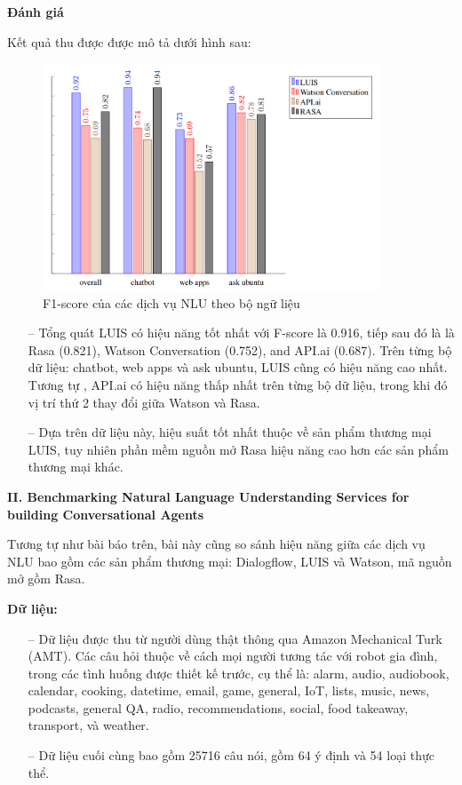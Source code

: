 \textbf{Đánh giá}

Kết quả thu được được mô tả dưới hình sau:

\begin{figure}[htp]
    \centering
    \includegraphics[width=10cm]{images/comparisonimg/FscoresNLUServices.png}
    \caption{F1-score của các dịch vụ NLU theo bộ ngữ liệu}
    \label{fig:comparisonimg-FscoresNLUServices}
\end{figure}

\begin{itemize}
    \item[--] Tổng quát LUIS có hiệu năng tốt nhất với F-score là 0.916, tiếp sau đó là là Rasa (0.821), Watson Conversation (0.752), and API.ai (0.687). Trên từng bộ dữ liệu: chatbot, web apps và ask ubuntu, LUIS cũng có hiệu năng cao nhất. Tương tự , API.ai có hiệu năng thấp nhất trên từng bộ dữ liệu, trong khi đó vị trí thứ 2 thay đổi giữa Watson và Rasa.
    \item[--] Dựa trên dữ liệu này, hiệu suất tốt nhất thuộc về sản phẩm thương mại LUIS, tuy nhiên phần mềm nguồn mở Rasa hiệu năng cao hơn các sản phẩm thương mại khác.
\end{itemize}

\textbf{II. Benchmarking Natural Language Understanding Services for building Conversational Agents}

Tương tự như bài báo trên, bài này cũng so sánh hiệu năng giữa các dịch vụ NLU bao gồm các sản phẩm thương mại: Dialogflow, LUIS và Watson, mã nguồn mở gồm Rasa.

\textbf{Dữ liệu: }

\begin{itemize}
    \item[--] Dữ liệu được thu từ người dùng thật thông qua Amazon Mechanical Turk (AMT). Các câu hỏi thuộc về cách mọi người tương tác với robot gia đình, trong các tình huống được thiết kế trước, cụ thể là: alarm, audio, audiobook, calendar, cooking, datetime, email, game, general, IoT, lists, music, news, podcasts, general QA, radio, recommendations, social, food takeaway, transport, và weather.
    \item[--] Dữ liệu cuối cùng bao gồm 25716 câu nói, gồm 64 ý định và 54 loại thực thể.
\end{itemize}

